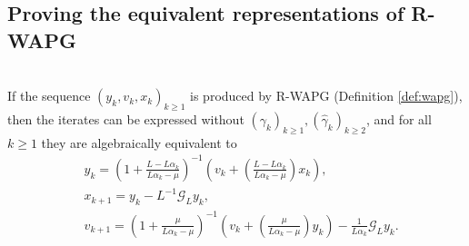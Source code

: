\documentclass[12pt]{article}
\begin{document}
    \subsection{Proving the equivalent representations of R-WAPG}
        \begin{proposition}\label{prop:wapg-first-equivalent-repr}\;\\
            If the sequence $(y_k, v_k, x_k)_{k \ge 1}$ is produced by R-WAPG (Definition \ref{def:wapg}), 
            then the iterates can be expressed without $(\gamma_k)_{k \ge1},(\hat \gamma_k)_{k \ge 2}$, and for all $k\ge 1$ they are algebraically equivalent to
            \begin{align*}
                & 
                y_{k} = 
                \left(
                    1 + \frac{L - L\alpha_{k}}{L\alpha_{k} - \mu}
                \right)^{-1}
                \left(
                    v_{k} + 
                    \left(\frac{L - L\alpha_{k}}{L\alpha_{k} - \mu} \right) x_{k}
                \right), 
                \\
                & x_{k + 1} = 
                y_k - L^{-1} \mathcal G_L y_k, 
                \\
                & v_{k + 1} = 
                \left(
                    1 + \frac{\mu}{L \alpha_k - \mu}
                \right)^{-1}
                \left(
                    v_k + 
                    \left(\frac{\mu}{L \alpha_k - \mu}\right) y_k
                \right) - \frac{1}{L\alpha_{k}}\mathcal G_L y_k. 
            \end{align*}
        \end{proposition}
\end{document}
